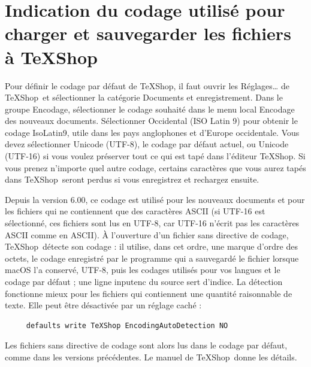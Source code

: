 \documentclass[11pt,french]{article}
\newcommand{\TS}{\textsf{\TeX Shop}}
\newcommand{\acr}[1]{\textsf{#1}}
\newcommand{\cmd}[1]{\textsf{#1}}
\begin{document}
\section{Indication du codage utilisé pour charger et sauvegarder les fichiers à \TS}\label{telltexshop}

Pour définir le codage par défaut de \TS, il faut ouvrir les \cmd{Réglages…} de \TS\ et sélectionner la catégorie \cmd{Documents et enregistrement}. Dans le groupe \cmd{Encodage}, sélectionner le codage souhaité dans le menu local \cmd{Encodage des nouveaux documents}. Sélectionner \acr{Occidental (ISO Latin 9)} pour obtenir le codage \acr{IsoLatin9}, utile dans les pays anglophones et d'Europe occidentale. Vous devez sélectionner \acr{Unicode (UTF-8)}, le codage par défaut actuel, ou \acr{Unicode (UTF-16)} si vous voulez préserver tout ce qui est tapé dans l'éditeur \TS. Si vous prenez n'importe quel autre codage, certains caractères que vous aurez tapés dans \TS\ seront perdus si vous enregistrez et rechargez ensuite.

Depuis la version 6.00, ce codage est utilisé pour les nouveaux documents et pour les fichiers qui ne contiennent que des caractères \acr{ASCII} (si \acr{UTF-16} est sélectionné, ces fichiers sont lus en \acr{UTF-8}, car \acr{UTF-16} n'écrit pas les caractères \acr{ASCII} comme en \acr{ASCII}). À l'ouverture d'un fichier sans directive de codage, \TS\ détecte son codage : il utilise, dans cet ordre, une marque d'ordre des octets, le codage enregistré par le programme qui a sauvegardé le fichier lorsque macOS l'a conservé, \acr{UTF-8}, puis les codages utilisés pour vos langues et le codage par défaut ; une ligne \cmd{inputenc} du source sert d'indice. La détection fonctionne mieux pour les fichiers qui contiennent une quantité raisonnable de texte. Elle peut être désactivée par un réglage caché :
\begin{verbatim}
     defaults write TeXShop EncodingAutoDetection NO
\end{verbatim}
Les fichiers sans directive de codage sont alors lus dans le codage par défaut, comme dans les versions précédentes. Le manuel de \TS\ donne les détails.
\end{document}
